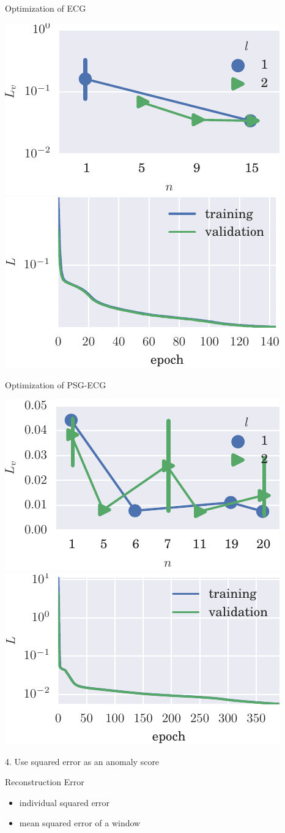 \documentclass{beamer}
\begin{document}
    \begin{frame}{Optimization of ECG}

      \includegraphics[width=.5\textwidth]{figs/bo_ecg.pdf}
      \includegraphics[width=.5\textwidth]{figs/trn_ecg.pdf}
      
    \end{frame}


    \begin{frame}{Optimization of PSG-ECG}

      \includegraphics[width=.5\textwidth]{figs/bo_sleep.pdf}
      \includegraphics[width=.5\textwidth]{figs/trn_sleep.pdf}
      
    \end{frame}


    \begin{frame}{4. Use squared error as an anomaly score}

      Reconstruction Error
      \begin{itemize}
      \item individual squared error
      \item mean squared error of a window
      \end{itemize}

    \end{frame}
    
\end{document}
